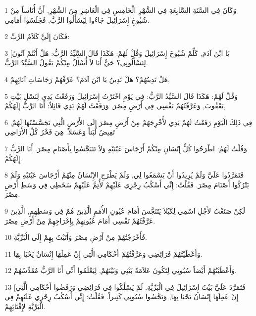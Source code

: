 \par 1 وَكَانَ فِي السَّنَةِ السَّابِعَةِ فِي الشَّهْرِ الْخَامِسِ فِي الْعَاشِرِ مِنَ الشَّهْرِ, أَنَّ أُنَاساً مِنْ شُيُوخِ إِسْرَائِيلَ جَاءُوا لِيَسْأَلُوا الرَّبَّ, فَجَلَسُوا أَمَامِي.
\par 2 فَكَانَ إِلَيَّ كَلاَمُ الرَّبِّ:
\par 3 [يَا ابْنَ آدَمَ, كَلِّمْ شُيُوخَ إِسْرَائِيلَ وَقُلْ لَهُمْ: هَكَذَا قَالَ السَّيِّدُ الرَّبُّ: هَلْ أَنْتُمْ آتُونَ لِتَسْأَلُونِي؟ حَيٌّ أَنَا لاَ أُسْأَلُ مِنْكُمْ يَقُولُ السَّيِّدُ الرَّبُّ.
\par 4 هَلْ تَدِينُهُمْ؟ هَلْ تَدِينُ يَا ابْنَ آدَمَ؟ عَرِّفْهُمْ رَجَاسَاتِ آبَائِهِمْ,
\par 5 وَقُلْ لَهُمْ: هَكَذَا قَالَ السَّيِّدُ الرَّبُّ: فِي يَوْمِ اخْتَرْتُ إِسْرَائِيلَ وَرَفَعْتُ يَدِي لِنَسْلِ بَيْتِ يَعْقُوبَ, وَعَرَّفْتُهُمْ نَفْسِي فِي أَرْضِ مِصْرَ, وَرَفَعْتُ لَهُمْ يَدِي قَائِلاً: أَنَا الرَّبُّ إِلَهُكُمْ,
\par 6 فِي ذَلِكَ الْيَوْمِ رَفَعْتُ لَهُمْ يَدِي لأُخْرِجَهُمْ مِنْ أَرْضِ مِصْرَ إِلَى الأَرْضِ الَّتِي تَجَسَّسْتُهَا لَهُمْ, تَفِيضُ لَبَناً وَعَسَلاً. هِيَ فَخْرُ كُلِّ الأَرَاضِي
\par 7 وَقُلْتُ لَهُمُ: اطْرَحُوا كُلُّ إِنْسَانٍ مِنْكُمْ أَرْجَاسَ عَيْنَيْهِ وَلاَ تَتَنَجَّسُوا بِأَصْنَامِ مِصْرَ. أَنَا الرَّبُّ إِلَهُكُمْ.
\par 8 فَتَمَرَّدُوا عَلَيَّ وَلَمْ يُرِيدُوا أَنْ يَسْمَعُوا لِي, وَلَمْ يَطْرَحِ الإِنْسَانُ مِنْهُمْ أَرْجَاسَ عَيْنَيْهِ وَلَمْ يَتْرُكُوا أَصْنَامَ مِصْرَ. فَقُلْتُ: إِنِّي أَسْكُبُ رِجْزِي عَلَيْهِمْ لأُتِمَّ عَلَيْهِمْ سَخَطِي فِي وَسَطِ أَرْضِ مِصْرَ.
\par 9 لَكِنْ صَنَعْتُ لأَجْلِ اسْمِي لِكَيْلاَ يَتَنَجَّسَ أَمَامَ عُيُونِ الأُمَمِ الَّذِينَ هُمْ فِي وَسَطِهِمِ, الَّذِينَ عَرَّفْتُهُمْ نَفْسِي أَمَامَ عُيُونِهِمْ بِإِخْرَاجِهِمْ مِنْ أَرْضِ مِصْرَ.
\par 10 فَأَخْرَجْتُهُمْ مِنْ أَرْضِ مِصْرَ وَأَتَيْتُ بِهِمْ إِلَى الْبَرِّيَّةِ.
\par 11 وَأَعْطَيْتُهُمْ فَرَائِضِي وَعَرَّفْتُهُمْ أَحْكَامِي الَّتِي إِنْ عَمِلَهَا إِنْسَانٌ يَحْيَا بِهَا.
\par 12 وَأَعْطَيْتُهُمْ أَيْضاً سُبُوتِي لِتَكُونَ عَلاَمَةً بَيْنِي وَبَيْنَهُمْ, لِيَعْلَمُوا أَنِّي أَنَا الرَّبُّ مُقَدِّسُهُمْ.
\par 13 [فَتَمَرَّدَ عَلَيَّ بَيْتُ إِسْرَائِيلَ فِي الْبَرِّيَّةِ. لَمْ يَسْلُكُوا فِي فَرَائِضِي وَرَفَضُوا أَحْكَامِي الَّتِي إِنْ عَمِلَهَا إِنْسَانٌ يَحْيَا بِهَا, وَنَجَّسُوا سُبُوتِي كَثِيراً. فَقُلْتُ: إِنِّي أَسْكُبُ رِجْزِي عَلَيْهِمْ فِي الْبَرِّيَّةِ لإِفْنَائِهِمْ.
